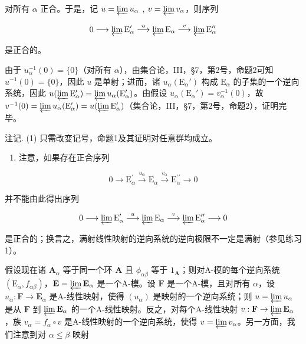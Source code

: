 对所有 \(\alpha\) 正合。于是，记 \(u = \varprojlim u_{\alpha}\) , \(v = \varprojlim v_{\alpha}\)，则序列

\[
0 \longrightarrow \varprojlim \mathrm{E} _ {\alpha} ^ {\prime} \stackrel {u} {\longrightarrow} \varprojlim \mathrm{E} _ {\alpha} \stackrel {v} {\longrightarrow} \varprojlim \mathrm{E} _ {\alpha} ^ {\prime \prime}
\]

是正合的。

由于 \(u_{\alpha}^{-1}(0) = \{0\}\)（对所有 \(\alpha\)），由集合论，III，§7，第2号，命题2可知 \(u^{-1}(0) = \{0\}\)，因此 \(u\) 是单射；进而，诸 \(u_{\alpha}(\mathrm{E}_{\alpha}')\) 构成 \(\mathrm{E}_{\alpha}\) 的子集的一个逆向系统，因此 \(u(\varprojlim \mathrm{E}_{\alpha}') = \varprojlim u_{\alpha}(\mathrm{E}_{\alpha}')\)。由假设 \(u_{\alpha}(\mathrm{E}_{\alpha}') = v_{\alpha}^{-1}(0)\)，故 \(v^{-1}(0) = \varprojlim u_{\alpha}(\mathrm{E}_{\alpha}') = u(\varprojlim \mathrm{E}_{\alpha}')\)（集合论，III，§7，第2号，命题2），证明完毕。

注记. (1) 只需改变记号，命题1及其证明对任意群均成立。

\begin{enumerate}
\def\labelenumi{(\arabic{enumi})}
\setcounter{enumi}{1}
\tightlist
\item
  注意，如果存在正合序列
\end{enumerate}

\[
0 \longrightarrow \mathrm{E} _ {\alpha} ^ {\prime} \stackrel {u _ {\alpha}} {\longrightarrow} \mathrm{E} _ {\alpha} \stackrel {v _ {\alpha}} {\longrightarrow} \mathrm{E} _ {\alpha} ^ {\prime \prime} \longrightarrow 0
\]

并不能由此得出序列

\[
0 \longrightarrow \varprojlim \mathrm{E} _ {\alpha} ^ {\prime} \stackrel {u} {\longrightarrow} \varprojlim \mathrm{E} _ {\alpha} \stackrel {v} {\longrightarrow} \varprojlim \mathrm{E} _ {\alpha} ^ {\prime \prime} \longrightarrow 0
\]

是正合的；换言之，满射线性映射的逆向系统的逆向极限不一定是满射（参见练习1）。

假设现在诸 \(\mathbf{A}_{\alpha}\) 等于同一个环 \(\mathbf{A}\) 且 \(\phi_{\alpha \beta}\) 等于 \(1_{\mathbf{A}}\)；则对A-模的每个逆向系统 \((\mathrm{E}_{\alpha}, f_{\alpha \beta})\)，\(\mathbf{E} = \varprojlim \mathbf{E}_{\alpha}\) 是一个A-模。设 \(\mathbf{F}\) 是一个A-模，且对所有 \(\alpha\)，设 \(u_{\alpha}: \mathbf{F} \to \mathbf{E}_{\alpha}\) 是A-线性映射，使得 \((u_{\alpha})\) 是映射的一个逆向系统；则 \(u = \varprojlim u_{\alpha}\) 是从 \(\mathbf{F}\) 到 \(\varprojlim \mathbf{E}_{\alpha}\) 的一个A-线性映射。反之，对每个A-线性映射 \(v: \mathbf{F} \to \varprojlim \mathbf{E}_{\alpha}\)，族 \(v_{\alpha} = f_{\alpha} \circ v\) 是A-线性映射的一个逆向系统，使得 \(v = \varprojlim v_{\alpha}\)。另一方面，我们注意到对 \(\alpha \leqslant \beta\) 映射

